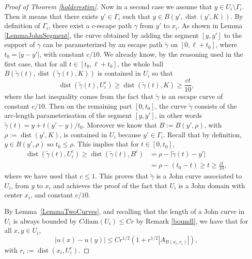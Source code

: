 \documentclass[12pt]{article}
\theoremstyle{definition}
\theoremstyle{remark}
\numberwithin{equation}{section}
\DeclareMathOperator{\dist}{dist}
\newcommand{\abs}[1]{\lvert #1 \rvert}
\begin{document}
\begin{proof}[Proof of Theorem \ref{holderestim}]
    Now in a second case we assume that $y \in U_i \setminus \Gamma_i$. Then it means that there exists $y'\in \Gamma_i$ such that $y\in B(y', \dist(y',K))$. By definition of $\Gamma_i$, there exist a $c$-escape path $\gamma$ from $y'$ to $x_i$. As shown in Lemma \ref{LemmaJohnSegment}, the curve obtained by adding the segment $[y,y']$ to the support of $\gamma$ can be parameterized by an escape path $\tilde \gamma$ on $[0,\ell+t_0]$, where $t_0=|y-y'|$, with constant $c/10$. 
    We already know, by the reasoning used in the first case, that for all 
    $t\in [t_0,\ell + t_0]$, the whole ball $B(\tilde\gamma(t),\dist(\tilde \gamma(t),K))$ is contained in $U_i$ so that 
    \[\dist(\tilde \gamma(t),U_i^c) \geq \dist(\tilde \gamma(t),K) \geq \frac{ct}{10},\]
    where the last inequality comes from the fact that $\tilde \gamma$ is an escape curve of constant $c/10$.
    Then on the remaining part $[0,t_0]$, the curve $\tilde \gamma$ consists of the arc-length parameterisation of the segment 
    $[y,y']$, in other words $\tilde \gamma(t)=y+ t(y'-y)/t_0$. Moreover   we know that $B:=B(y', \rho)$, with $\rho:=\dist(y',K)$, is contained in $U_i$ because $y' \in \Gamma_i$. Recall that by definition, $y \in B(y',\rho)$ so $t_0 \leq \rho$. This implies that for $t \in [0,t_0]$,
    \begin{align}
        \dist(\tilde \gamma(t), U_i^c)\geq \dist(\tilde \gamma(t), B^c) &= \rho - \abs{\tilde \gamma(t) - y'}\\
                                                                        &= \rho-(t_0 - t) \geq t\geq \frac{ct}{10},
    \end{align}
    where we have used that   $c\leq 1$. This proves that $\tilde \gamma$ is a John curve associated to $U_i$, from $y$ to $x_i$ and   achieves the proof of the fact that $U_i$ is a John domain with center $x_i$, and constant $c/10$.




    By Lemma~\ref{LemmaTwoCurves}, and recalling that the length of a John curve in $U_i$ is always bounded by $C \mathrm{diam}(U_i) \leq Cr$
    by Remark \ref{boundl}, we have that for all $x,y \in U_i$,
    \begin{equation}\label{eqeq19}
        |u(x)-u(y)|\leq C r^{1/2}(1+r^{1/2} |A_{B(x_i, r_i)}|),
    \end{equation}
    with $r_i:=\dist(x_i,U_i^c)$. 
    \end{proof}
    
\end{document}
